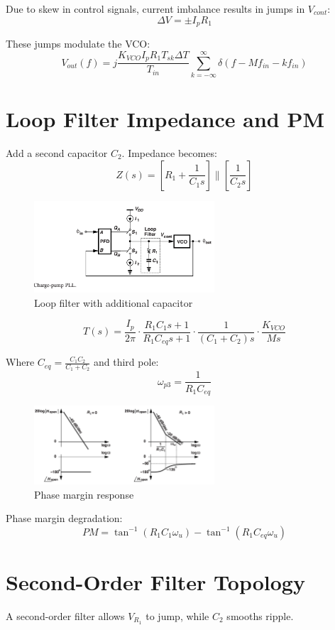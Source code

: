 \documentclass[12pt]{article}
\begin{document}
Due to skew in control signals, current imbalance results in jumps in $V_{cont}$:
\[
\Delta V = \pm I_p R_1
\]

These jumps modulate the VCO:
\[
V_{out}(f) = j\frac{K_{VCO} I_p R_1 T_{sk} \Delta T}{T_{in}} \sum_{k=-\infty}^{\infty} \delta(f - M f_{in} - k f_{in})
\]

\section{Loop Filter Impedance and PM}
Add a second capacitor $C_2$. Impedance becomes:
\[
Z(s) = \left[R_1 + \frac{1}{C_1 s} \right] \parallel \left[ \frac{1}{C_2 s} \right]
\]

\begin{figure}[H]
    \centering
    \includegraphics[width=0.6\textwidth]{figs/cp7}
    \caption{Loop filter with additional capacitor}
\end{figure}

\[
T(s) = \frac{I_p}{2\pi} \cdot \frac{R_1 C_1 s + 1}{R_1 C_{eq} s + 1} \cdot \frac{1}{(C_1 + C_2)s} \cdot \frac{K_{VCO}}{Ms}
\]

Where $C_{eq} = \frac{C_1 C_2}{C_1 + C_2}$ and third pole:
\[
\omega_{p3} = \frac{1}{R_1 C_{eq}}
\]

\begin{figure}[H]
    \centering
    \includegraphics[width=0.6\textwidth]{figs/cp8}
    \caption{Phase margin response}
\end{figure}

Phase margin degradation:
\[
PM = \tan^{-1}(R_1 C_1 \omega_u) - \tan^{-1}(R_1 C_{eq} \omega_u)
\]

\section{Second-Order Filter Topology}
A second-order filter allows $V_{R_1}$ to jump, while $C_2$ smooths ripple.
\end{document}

